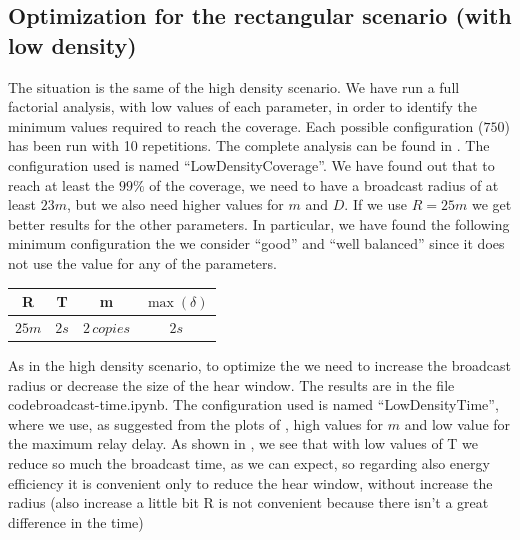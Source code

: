 \subsection{Optimization for the rectangular scenario (with low density)}\label{subsec:rectoptimization}

The situation is the same of the high density scenario. We have run a full
factorial analysis, with low values of each parameter, in order to identify the
minimum values required to reach the coverage. Each possible configuration
(\(750\)) has been run with 10 repetitions. The complete analysis can be found
in . The configuration used is named
``LowDensityCoverage''. We have found out that to reach at least the \(99\%\) of
the coverage, we need to have a broadcast radius of at least \(23m\), but we
also need higher values for \(m\) and \(D\). If we use \(R\!=\!25m\) we get
better results for the other parameters. In particular, we have found the
following minimum configuration the we consider ``good'' and ``well balanced''
since it does not use the value  for any of the parameters.

\begin{center}
	\begin{tabular}{cccc}
		\toprule
		R & T & m & \(\max(\delta)\) \\
		\midrule
		\(25m\) & \(2s\) & \(2\,\mathit{copies}\) & \(2s\) \\
		\bottomrule
	\end{tabular}
\end{center}

As in the high density scenario, to optimize the 
we need to increase the broadcast radius or decrease the size of the hear
window. The results are in the file code{broadcast-time.ipynb}. The
configuration used is named ``LowDensityTime'', where we use, as suggested from
the plots of , high values for \(m\) and low value for the
maximum relay delay. As shown in , we see that with low
values of T we reduce so much the broadcast time, as we can expect, so regarding
also energy efficiency it is convenient only to reduce the hear window, without
increase the radius (also increase a little bit R is not convenient because
there isn't a great difference in the time)

